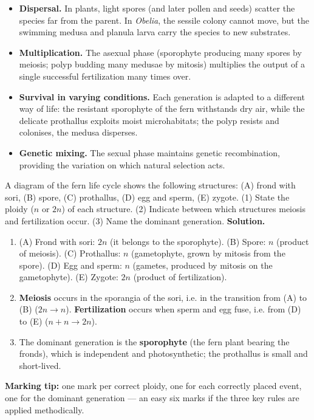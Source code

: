 \documentclass[11pt]{article}
\begin{document}
\begin{itemize}
\item \textbf{Dispersal.} In plants, light spores (and later pollen and seeds) scatter the species far from the parent. In \emph{Obelia}, the sessile colony cannot move, but the swimming medusa and planula larva carry the species to new substrates.
\item \textbf{Multiplication.} The asexual phase (sporophyte producing many spores by meiosis; polyp budding many medusae by mitosis) multiplies the output of a single successful fertilization many times over.
\item \textbf{Survival in varying conditions.} Each generation is adapted to a different way of life: the resistant sporophyte of the fern withstands dry air, while the delicate prothallus exploits moist microhabitats; the polyp resists and colonises, the medusa disperses.
\item \textbf{Genetic mixing.} The sexual phase maintains genetic recombination, providing the variation on which natural selection acts.
\end{itemize}

\begin{exoresolu}
A diagram of the fern life cycle shows the following structures: (A) frond with sori, (B) spore, (C) prothallus, (D) egg and sperm, (E) zygote. (1) State the ploidy ($n$ or $2n$) of each structure. (2) Indicate between which structures meiosis and fertilization occur. (3) Name the dominant generation.
\tcblower
\textbf{Solution.}
\begin{enumerate}
\item (A) Frond with sori: $2n$ (it belongs to the sporophyte). (B) Spore: $n$ (product of meiosis). (C) Prothallus: $n$ (gametophyte, grown by mitosis from the spore). (D) Egg and sperm: $n$ (gametes, produced by mitosis on the gametophyte). (E) Zygote: $2n$ (product of fertilization).
\item \textbf{Meiosis} occurs in the sporangia of the sori, i.e. in the transition from (A) to (B) ($2n \rightarrow n$). \textbf{Fertilization} occurs when sperm and egg fuse, i.e. from (D) to (E) ($n + n \rightarrow 2n$).
\item The dominant generation is the \textbf{sporophyte} (the fern plant bearing the fronds), which is independent and photosynthetic; the prothallus is small and short-lived.
\end{enumerate}
\textbf{Marking tip:} one mark per correct ploidy, one for each correctly placed event, one for the dominant generation — an easy six marks if the three key rules are applied methodically.
\end{exoresolu}
\end{document}

